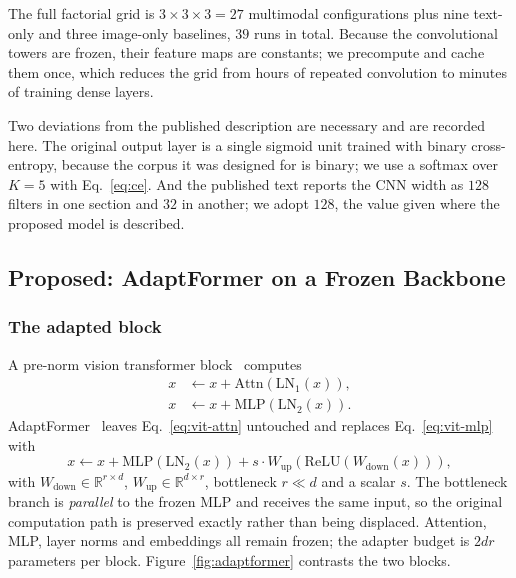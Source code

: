 \documentclass[conference]{IEEEtran}
\begin{document}
The full factorial grid is $3 \times 3 \times 3 = 27$ multimodal configurations
plus nine text-only and three image-only baselines, $39$ runs in total. Because
the convolutional towers are frozen, their feature maps are constants; we
precompute and cache them once, which reduces the grid from hours of repeated
convolution to minutes of training dense layers.

Two deviations from the published description are necessary and are recorded
here. The original output layer is a single sigmoid unit trained with binary
cross-entropy, because the corpus it was designed for is binary; we use a
softmax over $K=5$ with Eq.~\eqref{eq:ce}. And the published text reports the
CNN width as $128$ filters in one section and $32$ in another; we adopt $128$,
the value given where the proposed model is described.

\subsection{Proposed: AdaptFormer on a Frozen Backbone}
\label{sec:method-peft}

\subsubsection{The adapted block}
A pre-norm vision transformer block~\cite{dosovitskiy2021} computes
\begin{align}
x &\leftarrow x + \mathrm{Attn}(\mathrm{LN}_1(x)), \label{eq:vit-attn}\\
x &\leftarrow x + \mathrm{MLP}(\mathrm{LN}_2(x)). \label{eq:vit-mlp}
\end{align}
AdaptFormer~\cite{chen2022} leaves Eq.~\eqref{eq:vit-attn} untouched and
replaces Eq.~\eqref{eq:vit-mlp} with
\begin{equation}
x \leftarrow x + \mathrm{MLP}(\mathrm{LN}_2(x))
        + s \cdot W_{\mathrm{up}}\!\left(\mathrm{ReLU}\!\left(W_{\mathrm{down}}(x)\right)\right),
\label{eq:adaptmlp}
\end{equation}
with $W_{\mathrm{down}} \in \mathbb{R}^{r \times d}$,
$W_{\mathrm{up}} \in \mathbb{R}^{d \times r}$, bottleneck $r \ll d$ and a scalar
$s$. The bottleneck branch is \emph{parallel} to the frozen MLP and receives the
same input, so the original computation path is preserved exactly rather than
being displaced. Attention, MLP, layer norms and embeddings all remain frozen;
the adapter budget is $2dr$ parameters per block. Figure~\ref{fig:adaptformer}
contrasts the two blocks.
\end{document}
